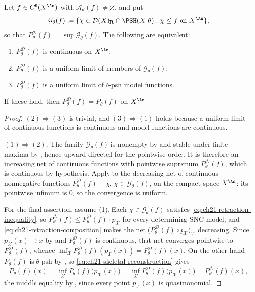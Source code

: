 \begin{corollary}
\label{cor:ch23-continuity-criterion}
Let \(f\in C^0(X^{\An})\) with \(\mathcal A_\theta(f)\ne\varnothing\), and
put
\begin{equation}\label{eq:ch23-model-competitor-family}
 \mathcal G_\theta(f):=\{\chi\in\mathcal D(X)_{\mathbf R}\cap\PSH(X,\theta):
   \chi\leq f\text{ on }X^{\An}\},
\end{equation}
so that \(P^{\mathcal D}_\theta(f)=\sup\mathcal G_\theta(f)\).  The
following are equivalent:
\begin{enumerate}
\item \(P^{\mathcal D}_\theta(f)\) is continuous on \(X^{\An}\);
\item \(P^{\mathcal D}_\theta(f)\) is a uniform limit of members of
\(\mathcal G_\theta(f)\);
\item \(P^{\mathcal D}_\theta(f)\) is a uniform limit of \(\theta\)-psh
model functions.
\end{enumerate}
If these hold, then \(P^{\mathcal D}_\theta(f)=P_\theta(f)\) on \(X^{\An}\).
\end{corollary}

\begin{proof}
\((2)\Rightarrow(3)\) is trivial, and \((3)\Rightarrow(1)\) holds because a
uniform limit of continuous functions is continuous and model functions are
continuous.

\((1)\Rightarrow(2)\).  The family \(\mathcal G_\theta(f)\) is nonempty by
 and stable under finite maxima by
, hence upward directed for the pointwise order.
It is therefore an increasing net of continuous functions with pointwise
supremum \(P^{\mathcal D}_\theta(f)\), which is continuous by hypothesis.
Apply  to the decreasing net of continuous nonnegative
functions \(P^{\mathcal D}_\theta(f)-\chi\), \(\chi\in\mathcal G_\theta(f)\),
on the compact space \(X^{\An}\): its pointwise infimum is \(0\), so the
convergence is uniform.

For the final assertion, assume (1).  Each \(\chi\in\mathcal G_\theta(f)\)
satisfies \eqref{eq:ch21-retraction-inequality}, so
\(P^{\mathcal D}_\theta(f)\leq P^{\mathcal D}_\theta(f)\circ p_{\mathcal X}\)
for every determining SNC model, and
\eqref{eq:ch21-retraction-composition} makes the net
\(\bigl(P^{\mathcal D}_\theta(f)\circ p_{\mathcal X}\bigr)_{\mathcal X}\)
decreasing.  Since \(p_{\mathcal X}(x)\to x\) by
 and \(P^{\mathcal D}_\theta(f)\) is
continuous, that net converges pointwise to
\(P^{\mathcal D}_\theta(f)\), whence
\(\inf_{\mathcal X}P^{\mathcal D}_\theta(f)(p_{\mathcal X}(x))
=P^{\mathcal D}_\theta(f)(x)\).  On the other hand \(P_\theta(f)\) is
\(\theta\)-psh by , so
\eqref{eq:ch21-skeletal-reconstruction} gives
\[
 P_\theta(f)(x)
 =\inf_{\mathcal X}P_\theta(f)\bigl(p_{\mathcal X}(x)\bigr)
 =\inf_{\mathcal X}P^{\mathcal D}_\theta(f)\bigl(p_{\mathcal X}(x)\bigr)
 =P^{\mathcal D}_\theta(f)(x),
\]
the middle equality by , since every
point \(p_{\mathcal X}(x)\) is quasimonomial.
\end{proof}

